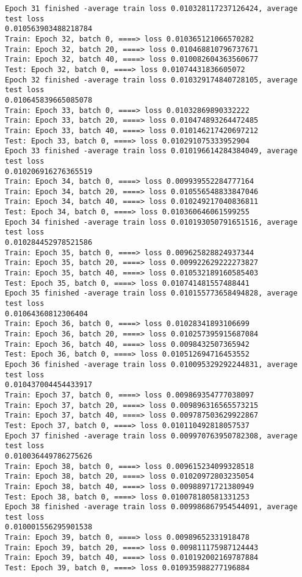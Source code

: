 \documentclass[11pt]{article}
\begin{document}
\begin{Verbatim}[commandchars=\\\{\}]
Epoch 31 finished -average train loss 0.010328117237126424, average test loss
0.010563903488218784
Train: Epoch 32, batch 0, ====> loss 0.010365121066570282
Train: Epoch 32, batch 20, ====> loss 0.010468810796737671
Train: Epoch 32, batch 40, ====> loss 0.010082604363560677
Test: Epoch 32, batch 0, ====> loss 0.01074431836605072
Epoch 32 finished -average train loss 0.010329174840728105, average test loss
0.010645839665085078
Train: Epoch 33, batch 0, ====> loss 0.01032869890332222
Train: Epoch 33, batch 20, ====> loss 0.010474893264472485
Train: Epoch 33, batch 40, ====> loss 0.010146217420697212
Test: Epoch 33, batch 0, ====> loss 0.010291075333952904
Epoch 33 finished -average train loss 0.010196614284384049, average test loss
0.010206916276365519
Train: Epoch 34, batch 0, ====> loss 0.009939552284777164
Train: Epoch 34, batch 20, ====> loss 0.010556548833847046
Train: Epoch 34, batch 40, ====> loss 0.010249217040836811
Test: Epoch 34, batch 0, ====> loss 0.010360646061599255
Epoch 34 finished -average train loss 0.010193050791651516, average test loss
0.010284452978521586
Train: Epoch 35, batch 0, ====> loss 0.009625828824937344
Train: Epoch 35, batch 20, ====> loss 0.009922629222273827
Train: Epoch 35, batch 40, ====> loss 0.010532189160585403
Test: Epoch 35, batch 0, ====> loss 0.010741481557488441
Epoch 35 finished -average train loss 0.010155773658494828, average test loss
0.01064360812306404
Train: Epoch 36, batch 0, ====> loss 0.01028341893106699
Train: Epoch 36, batch 20, ====> loss 0.010257395915687084
Train: Epoch 36, batch 40, ====> loss 0.0098432507365942
Test: Epoch 36, batch 0, ====> loss 0.010512694716453552
Epoch 36 finished -average train loss 0.010095329292244831, average test loss
0.010437004454433917
Train: Epoch 37, batch 0, ====> loss 0.009869354777038097
Train: Epoch 37, batch 20, ====> loss 0.009896316565573215
Train: Epoch 37, batch 40, ====> loss 0.009787503629922867
Test: Epoch 37, batch 0, ====> loss 0.010110492818057537
Epoch 37 finished -average train loss 0.009970763950782308, average test loss
0.010036449786275626
Train: Epoch 38, batch 0, ====> loss 0.009615234099328518
Train: Epoch 38, batch 20, ====> loss 0.01020972803235054
Train: Epoch 38, batch 40, ====> loss 0.00988971721380949
Test: Epoch 38, batch 0, ====> loss 0.010078180581331253
Epoch 38 finished -average train loss 0.009986867954544091, average test loss
0.010001556295901538
Train: Epoch 39, batch 0, ====> loss 0.00989652331918478
Train: Epoch 39, batch 20, ====> loss 0.009811175987124443
Train: Epoch 39, batch 40, ====> loss 0.010192002169787884
Test: Epoch 39, batch 0, ====> loss 0.010935988277196884

\end{Verbatim}
\end{document}
